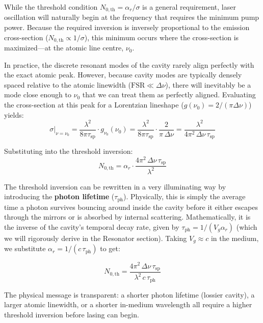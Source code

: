 While the threshold condition $N_{0,\text{th}} = \alpha_r/\sigma$ is a general requirement, laser oscillation will naturally begin at the frequency that requires the minimum pump power. Because the required inversion is inversely proportional to the emission cross-section ($N_{0,\text{th}} \propto 1/\sigma$), this minimum occurs where the cross-section is maximized---at the atomic line centre, $\nu_0$.

In practice, the discrete resonant modes of the cavity rarely align perfectly with the exact atomic peak. However, because cavity modes are typically densely spaced relative to the atomic linewidth ($\text{FSR} \ll \Delta\nu$), there will inevitably be a mode close enough to $\nu_0$ that we can treat them as perfectly aligned. Evaluating the cross-section at this peak for a Lorentzian lineshape ($g(\nu_0) = 2/(\pi\Delta\nu)$) yields:
\begin{equation*}
    \sigma\big|_{\nu=\nu_0} = \frac{\lambda^2}{8\pi\tau_{\text{sp}}}\cdot g_{\nu_0}(\nu_0)
    = \frac{\lambda^2}{8\pi\tau_{\text{sp}}}\cdot\frac{2}{\pi\,\Delta\nu}
    = \frac{\lambda^2}{4\pi^2\,\Delta\nu\,\tau_{\text{sp}}}
\end{equation*}

Substituting into the threshold inversion:
\begin{equation*}
    N_{0,\text{th}} = \alpha_r\cdot\frac{4\pi^2\,\Delta\nu\,\tau_{\text{sp}}}{\lambda^2}
\end{equation*}

The threshold inversion can be rewritten in a very illuminating way by introducing the \textbf{photon lifetime} ($\tau_{\text{ph}}$). Physically, this is simply the average time a photon survives bouncing around inside the cavity before it either escapes through the mirrors or is absorbed by internal scattering. Mathematically, it is the inverse of the cavity's temporal decay rate, given by $\tau_{\text{ph}} = 1/(V_g \alpha_r)$ (which we will rigorously derive in the Resonator section). Taking $V_g \approx c$ in the medium, we substitute $\alpha_r = 1/(c\,\tau_{\text{ph}})$ to get:
\begin{keyresult}
    \begin{equation}
        N_{0,\text{th}} = \frac{4\pi^2\,\Delta\nu\,\tau_{\text{sp}}}{\lambda^2\,c\,\tau_{\text{ph}}}
    \end{equation}
\end{keyresult}

The physical message is transparent: a shorter photon lifetime (lossier cavity), a larger atomic linewidth, or a shorter in-medium wavelength all require a higher threshold inversion before lasing can begin.


